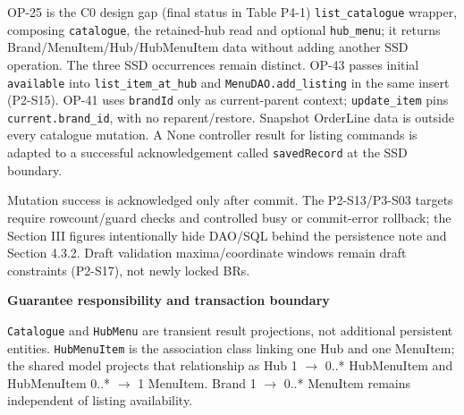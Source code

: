 OP-25 is the C0 design gap (final status in Table P4-1) \texttt{list\_\allowbreak{}catalogue} wrapper, composing \texttt{catalogue}, the retained-hub read and optional \texttt{hub\_\allowbreak{}menu}; it returns Brand/MenuItem/Hub/HubMenuItem data without adding another SSD operation. The three SSD occurrences remain distinct. OP-43 passes initial \texttt{available} into \texttt{list\_\allowbreak{}item\_\allowbreak{}at\_\allowbreak{}hub} and \texttt{MenuDAO.\allowbreak{}add\_\allowbreak{}listing} in the same insert (P2-S15). OP-41 uses \texttt{brandId} only as current-parent context; \texttt{update\_\allowbreak{}item} pins \texttt{current.\allowbreak{}brand\_\allowbreak{}id}, with no reparent/restore. Snapshot OrderLine data is outside every catalogue mutation. A None controller result for listing commands is adapted to a successful acknowledgement called \texttt{savedRecord} at the SSD boundary.

Mutation success is acknowledged only after commit. The P2-S13/P3-S03 targets require rowcount/guard checks and controlled busy or commit-error rollback; the Section III figures intentionally hide DAO/SQL behind the persistence note and Section 4.3.2. Draft validation maxima/coordinate windows remain draft constraints (P2-S17), not newly locked BRs.

\textbf{Guarantee responsibility and transaction boundary}

\texttt{Catalogue} and \texttt{HubMenu} are transient result projections, not additional persistent entities. \texttt{HubMenuItem} is the association class linking one Hub and one MenuItem; the shared model projects that relationship as Hub 1 \ensuremath{\rightarrow} 0..* HubMenuItem and HubMenuItem 0..* \ensuremath{\rightarrow} 1 MenuItem. Brand 1 \ensuremath{\rightarrow} 0..* MenuItem remains independent of listing availability.

